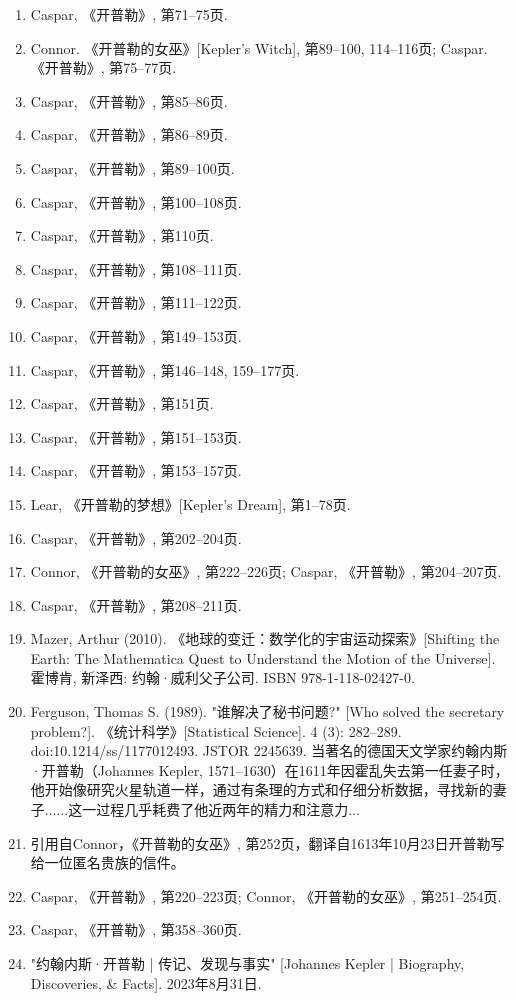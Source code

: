 \begin{enumerate}
\item Caspar, 《开普勒》, 第71–75页.
\item Connor. 《开普勒的女巫》[Kepler's Witch], 第89–100, 114–116页; Caspar. 《开普勒》, 第75–77页.
\item Caspar, 《开普勒》, 第85–86页.
\item Caspar, 《开普勒》, 第86–89页.
\item Caspar, 《开普勒》, 第89–100页.
\item  Caspar, 《开普勒》, 第100–108页.
\item Caspar, 《开普勒》, 第110页.
\item Caspar, 《开普勒》, 第108–111页.
\item Caspar, 《开普勒》, 第111–122页.
\item Caspar, 《开普勒》, 第149–153页.
\item Caspar, 《开普勒》, 第146–148, 159–177页.
\item Caspar, 《开普勒》, 第151页.
\item Caspar, 《开普勒》, 第151–153页.
\item Caspar, 《开普勒》, 第153–157页.
\item Lear, 《开普勒的梦想》[Kepler's Dream], 第1–78页.
\item Caspar, 《开普勒》, 第202–204页.
\item Connor, 《开普勒的女巫》, 第222–226页; Caspar, 《开普勒》, 第204–207页.
\item Caspar, 《开普勒》, 第208–211页.
\item Mazer, Arthur (2010). 《地球的变迁：数学化的宇宙运动探索》[Shifting the Earth: The Mathematica Quest to Understand the Motion of the Universe]. 霍博肯, 新泽西: 约翰·威利父子公司. ISBN 978-1-118-02427-0.
\item Ferguson, Thomas S. (1989). "谁解决了秘书问题?" [Who solved the secretary problem?]. 《统计科学》[Statistical Science]. 4 (3): 282–289. doi:10.1214/ss/1177012493. JSTOR 2245639. 当著名的德国天文学家约翰内斯·开普勒（Johannes Kepler, 1571–1630）在1611年因霍乱失去第一任妻子时，他开始像研究火星轨道一样，通过有条理的方式和仔细分析数据，寻找新的妻子......这一过程几乎耗费了他近两年的精力和注意力...
\item 引用自Connor，《开普勒的女巫》, 第252页，翻译自1613年10月23日开普勒写给一位匿名贵族的信件。
\item Caspar, 《开普勒》, 第220–223页; Connor, 《开普勒的女巫》, 第251–254页.
\item Caspar, 《开普勒》, 第358–360页.
\item "约翰内斯·开普勒 | 传记、发现与事实" [Johannes Kepler | Biography, Discoveries, & Facts]. 2023年8月31日.

\end{enumerate}
